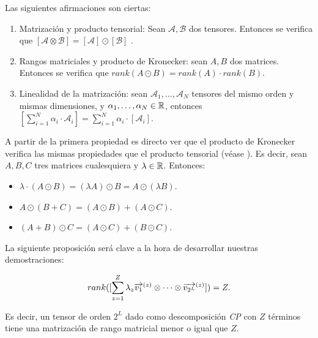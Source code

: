 \begin{proposicion} Las siguientes afirmaciones son ciertas:

    \begin{enumerate}
        \item Matrización y producto tensorial: Sean $\mathcal{A}, \mathcal{B}$ dos tensores. Entonces se verifica que $[\mathcal{A} \otimes \mathcal{B}] = [\mathcal{A}] \odot [\mathcal{B}]$ \label{prop:prop_fundamentales_primera}.
        \item Rangos matriciales y producto de Kronecker: sean $A, B$ dos matrices. Entonces se verifica que $rank(A \odot B) = rank(A) \cdot rank(B)$.
        \item Linealidad de la matrización: sean $\mathcal{A}_1, \ldots, \mathcal{A}_N$ tensores del mismo orden y mismas dimensiones, y $\alpha_1, \ldots, \alpha_N \in \mathbb{R}$, entonces $[\sum_{i = 1}^N \alpha_i \cdot \mathcal{A}_i] = \sum_{i = 1}^N \alpha_i \cdot [\mathcal{A}_i]$.
    \end{enumerate}

\end{proposicion}

\begin{observacion} A partir de la primera propiedad es directo ver que el producto de Kronecker verifica las mismas propiedades que el producto tensorial (véase ). Es decir, sean $A, B, C$ tres matrices cualesquiera y $\lambda \in \mathbb{R}$. Entonces:

\begin{itemize}
    \item $\lambda \cdot (A \odot B) = (\lambda A) \odot B = A \odot (\lambda B)$.
    \item $A \odot (B + C) = (A \odot B) + (A \odot C)$.
    \item $(A + B) \odot C = (A \odot C) + (B \odot C)$.
\end{itemize}

\end{observacion}

La siguiente proposición será clave a la hora de desarrollar nuestras demostraciones:

\begin{proposicion} \label{prop:rango_matricial_descomp_cp}

    \begin{equation}
        rank([\sum_{z = 1}^Z \lambda_z \overrightarrow{v_1}^{(z)} \otimes \cdots \otimes \overrightarrow{v_{2^L}}^{(z)}]) = Z.
    \end{equation}

    Es decir, un tensor de orden $2^L$ dado como descomposición \textit{CP} con $Z$ términos tiene una matrización de rango matricial menor o igual que $Z$.

\end{proposicion}

